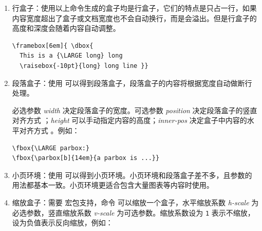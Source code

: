 \begin{enumerate}
\begin{tcolorbox}[sidebyside, righthand width=0.4\linewidth]
\tcblower

\raisebox{10pt}[0pt][0pt]{\LARGE
    \hspace{-30pt}
} and following content
\end{tcolorbox}

\item 行盒子：使用以上命令生成的盒子均是行盒子，它们的特点是只占一行，如果内容宽度超出了盒子或文档宽度也不会自动换行，而是会溢出。但是行盒子的高度和深度会随着内容自动调整。

\begin{tcolorbox}[sidebyside]
\begin{lstlisting}
\framebox[6em]{ \dbox{  
  This is a {\LARGE long} long 
  \raisebox{-10pt}{long} long line }}
\end{lstlisting} 

\tcblower

\end{tcolorbox}

\item 段落盒子：使用  可以得到段落盒子，段落盒子的内容将根据宽度自动做断行处理。

必选参数 {\ttfamily\itshape width} 决定段落盒子的宽度。可选参数 {\ttfamily\itshape position} 决定段落盒子的竖直对齐方式 ；{\ttfamily\itshape height} 可以手动指定内容的高度；{\ttfamily\itshape inner-pos} 决定盒子中内容的水平对齐方式  。例如：

\begin{tcolorbox}[sidebyside, righthand width=0.45\linewidth]
\begin{lstlisting}
\fbox{\LARGE parbox:} 
\fbox{\parbox[b]{14em}{a parbox is ...}}
\end{lstlisting} 

\tcblower

 
\end{tcolorbox}

\item 小页环境：使用  可以得到小页环境。小页环境和段落盒子差不多，且参数的用法都基本一致。小页环境更适合包含大量图表等内容时使用。

\item 缩放盒子：需要  宏包支持，命令  可以缩放一个盒子，水平缩放系数 {\ttfamily\itshape h-scale} 为必选参数，竖直缩放系数 {\ttfamily\itshape v-scale} 为可选参数。缩放系数设为 \verb|1| 表示不缩放，设为负值表示反向缩放，例如：


\end{enumerate}
